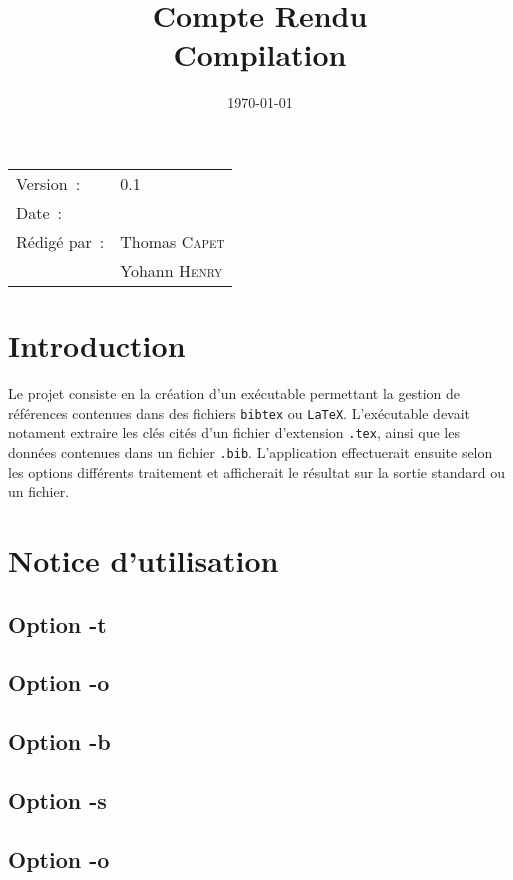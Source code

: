 \documentclass[hidelinks, a4paper,11pt,twoside,final]{article}
\title{\bfseries Compte Rendu \\ Compilation}
\begin{document}
\maketitle
\begin{center}
\begin{tabular}{ll}
  Version~: & 0.1\\[.5em]
  Date~: & \date{\today}\\[.5em]
  Rédigé par~: & Thomas \textsc{Capet}\\
               & Yohann \textsc{Henry}\\
\end{tabular}
\end{center}

\newpage

\newpage
\tableofcontents

\newpage

\section{Introduction}
Le projet consiste en la création d'un exécutable permettant la gestion de références contenues dans des fichiers \texttt{bibtex} ou \texttt{LaTeX}.
L'exécutable devait notament extraire les clés cités d'un fichier d'extension \texttt{.tex}, ainsi que les données contenues dans un fichier \texttt{.bib}.
L'application effectuerait ensuite selon les options différents traitement et afficherait le résultat sur la sortie standard ou un fichier.

\section{Notice d'utilisation}
\subsection{Option -t}
\subsection{Option -o}
\subsection{Option -b}
\subsection{Option -s}
\subsection{Option -o}
\end{document}

